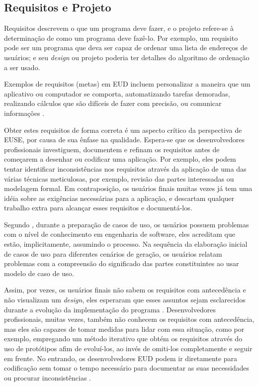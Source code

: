 \subsection{Requisitos e Projeto}

Requisitos descrevem o que um programa deve fazer, e o projeto refere-se à determinação de como um programa deve fazê-lo. Por exemplo, um requisito pode ser um programa que deva ser capaz de ordenar uma lista de endereços de usuários; e seu \textit{design} ou projeto poderia ter detalhes do algoritmo de ordenação a ser usado.

Exemplos de requisitos (metas) em EUD incluem personalizar a maneira que um aplicativo ou computador se comporta, automatizando tarefas demoradas, realizando cálculos que são difíceis de fazer com precisão, ou comunicar informações \cite{ko2011state,blackwell2003notational,rosson2005minimalist}.

Obter estes requisitos de forma correta é um aspecto crítico da perspectiva de EUSE, por causa de sua ênfase na qualidade. Espera-se que os desenvolvedores profissionais investiguem, documentem e refinam os requisitos antes de começarem a desenhar ou codificar uma aplicação. Por exemplo, eles podem tentar identificar inconsistências nos requisitos através da aplicação de uma das várias técnicas meticulosas, por exemplo, revisão das partes interessadas ou modelagem formal. Em contraposição, os usuários finais muitas vezes já tem uma idéia sobre as exigências necessárias para a aplicação, e descartam qualquer trabalho extra para alcançar esses requisitos e documentá-los.

Segundo , durante a preparação de casos de uso, os usuários possuem problemas com o nível de conhecimento em engenharia de software, eles acreditam que estão, implicitamente, assumindo o processo. Na sequência da elaboração inicial de casos de uso para diferentes cenários de geração, os usuários relatam problemas com a compreensão do significado das partes constituintes ao usar modelo de caso de uso.

Assim, por vezes, os usuários finais não sabem os requisitos com antecedência e não visualizam um \textit{design}, eles esperaram que esses assuntos sejam esclarecidos durante a evolução da implementação do programa \cite{costabile2006supporting,fischer2006meta,morch2000tailoring}. Desenvolvedores profissionais, muitas vezes, também não conhecem os requisitos com antecedência, mas eles são capazes de tomar medidas para lidar com essa situação, como por exemplo, empregando um método iterativo que obtém os requisitos através do uso de protótipos afim de evoluí-los, ao invés de omiti-los completamente e seguir em frente. No entrando, os desenvolvedores EUD podem ir diretamente para codificação sem tomar o tempo necessário para documentar as suas necessidades ou procurar inconsistências \cite{rosson2013end}.


